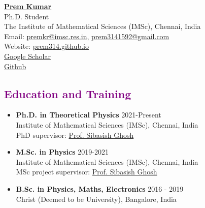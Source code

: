 \documentclass[a4paper,11pt]{article}
\newcommand{\sectionheading}[1]{\subsection*{\textcolor{purple}{#1}}}
\begin{document}
\begin{center}
    \LARGE{\href{https://scholar.google.com/citations?hl=en&user=f-ZPkk0AAAAJ}{\textbf{Prem Kumar}}} \\[0.2cm]
    \large{Ph.D. Student} \\[0.1cm]
    \large{The Institute of Mathematical Sciences (IMSc), Chennai, India} \\[0.1cm]
    Email: \href{mailto:premkr@imsc.res.in}{premkr@imsc.res.in}, \href{mailto:prem3141592@gmail.com}{prem3141592@gmail.com} \\
    Website: \href{https://prem314.github.io}{prem314.github.io}\\
    \href{https://scholar.google.com/citations?hl=en&user=f-ZPkk0AAAAJ}{Google Scholar}\\
    \href{https://github.com/prem314}{Github}\\[0.1cm]
\end{center}


\sectionheading{Education and Training}
\begin{itemize}[leftmargin=*,label={}]
    \item \textbf{Ph.D. in Theoretical Physics} \hfill 2021-Present \\
          Institute of Mathematical Sciences (IMSc), Chennai, India \\
          PhD supervisor: \href{https://scholar.google.com/citations?user=zr0J0lMAAAAJ&hl=en&oi=ao}{Prof. Sibasish Ghosh}
    \item \textbf{M.Sc. in Physics} \hfill 2019-2021 \\
          Institute of Mathematical Sciences (IMSc), Chennai, India \\
          MSc project supervisor: \href{https://scholar.google.com/citations?user=zr0J0lMAAAAJ&hl=en&oi=ao}{Prof. Sibasish Ghosh}
    \item \textbf{B.Sc. in Physics, Maths, Electronics} \hfill 2016 - 2019\\
    Christ (Deemed to be University), Bangalore, India
\end{itemize}
\end{document}
